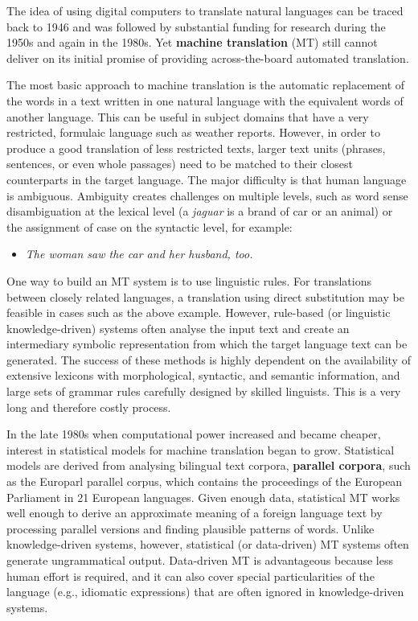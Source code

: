 \begin{multicols}{2}
The idea of using digital computers to translate natural languages can be traced back to 1946 and was followed by substantial funding for research during the 1950s and again in the 1980s. 
Yet \textbf{machine translation} (MT) still cannot deliver on its initial promise of providing across-the-board automated translation.  


The most basic approach to machine translation is the automatic replacement of the words in a text written in one natural language with the equivalent words of another language. This can be useful in subject domains that have a very restricted, formulaic language such as weather reports.
However, in order to produce a good translation of less restricted texts, larger text units (phrases, sentences, or even whole passages) need to be matched to their closest counterparts in the target language. The major difficulty is that human language is ambiguous. Ambiguity creates challenges on multiple levels, such as word sense disambiguation at the lexical level (a \textit{jaguar} is a brand of car or an animal) or the assignment of case on the syntactic level, for example:

\begin{itemize}
\item {\it The woman saw the car and her husband, too.}
\end{itemize}

One way to build an MT system is to use linguistic rules. For translations between closely related languages, a translation using direct substitution may be feasible in cases such as the above example. However, rule-based (or linguistic knowledge-driven) systems often analyse the input text and create an intermediary symbolic representation from which the target language text can be generated. The success of these methods is highly dependent on the availability of extensive lexicons with morphological, syntactic, and semantic information, and large sets of grammar rules carefully designed by skilled linguists. This is a very long and therefore costly process.

In the late 1980s when computational power increased and became cheaper, interest in statistical models for machine translation began to grow. Statistical models are derived from analysing bilingual text corpora, \textbf{parallel corpora}, such as the Europarl parallel corpus, which contains the proceedings of the European Parliament in 21 European languages. Given enough data, statistical MT works well enough to derive an approximate meaning of a foreign language text by processing parallel versions and finding plausible patterns of words. Unlike knowledge-driven systems, however, statistical (or data-driven) MT systems often generate ungrammatical output. Data-driven MT is advantageous because less human effort is required, and it can also cover special particularities of the language (e.g., idiomatic expressions) that are often ignored in knowledge-driven systems. 


\end{multicols}
